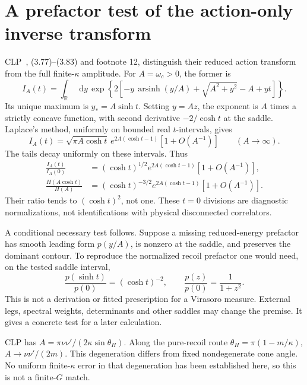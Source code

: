 \documentclass[11pt,a4paper]{article}
\newcommand{\dd}{\mathop{}\!\mathrm d}
\begin{document}
\section{A prefactor test of the action-only inverse transform}
CLP~\cite{CLP}, (3.77)--(3.83) and footnote 12, distinguish their reduced
action transform from the full finite-\(\kappa\) amplitude.
For \(A=\omega_c>0\), the former is
\begin{equation}
 I_A(t)=\int_{\mathbb R}\dd y\,
 \exp\left\{2\left[-y\,\operatorname{arsinh}(y/A)
 +\sqrt{A^2+y^2}-A+yt\right]\right\}. \label{eq:I}
\end{equation}
Its unique maximum is \(y_*=A\sinh t\).
Setting \(y=Az\), the exponent is \(A\) times a strictly concave
function, with second derivative \(-2/\cosh t\) at the saddle.
Laplace's method, uniformly on bounded real \(t\)-intervals, gives
\[
 I_A(t)=\sqrt{\pi A\cosh t}\,
 e^{2A(\cosh t-1)}[1+O(A^{-1})]\qquad(A\to\infty).
\]
The tails decay uniformly on these intervals. Thus
\begin{align}
 \frac{I_A(t)}{I_A(0)}
 &= (\cosh t)^{1/2} e^{2A(\cosh t-1)}[1+O(A^{-1})],\\
 \frac{H(A\cosh t)}{H(A)}
 &= (\cosh t)^{-3/2} e^{2A(\cosh t-1)}[1+O(A^{-1})].
\end{align}
Their ratio tends to \((\cosh t)^2\), not one.
These \(t=0\) divisions are diagnostic normalizations, not
identifications with physical disconnected correlators.

A conditional necessary test follows. Suppose a missing reduced-energy
prefactor has smooth leading form \(p(y/A)\), is nonzero at the saddle,
and preserves the dominant contour. To reproduce the normalized recoil
prefactor one would need, on the tested saddle interval,
\begin{equation}
 \frac{p(\sinh t)}{p(0)}=(\cosh t)^{-2},
 \qquad \frac{p(z)}{p(0)}=\frac1{1+z^2}. \label{eq:test}
\end{equation}
This is not a derivation or fitted prescription for a Virasoro measure.
External legs, spectral weights, determinants and other saddles may
change the premise. It gives a concrete test for a later calculation.

CLP has \(A=\pi\nu\nu'/(2\kappa\sin\theta_H)\). Along the pure-recoil
route \(\theta_H=\pi(1-m/\kappa)\), \(A\to\nu\nu'/(2m)\).
This degeneration differs from fixed nondegenerate cone angle.
No uniform finite-\(\kappa\) error in that degeneration has been
established here, so this is not a finite-\(G\) match.
\end{document}
